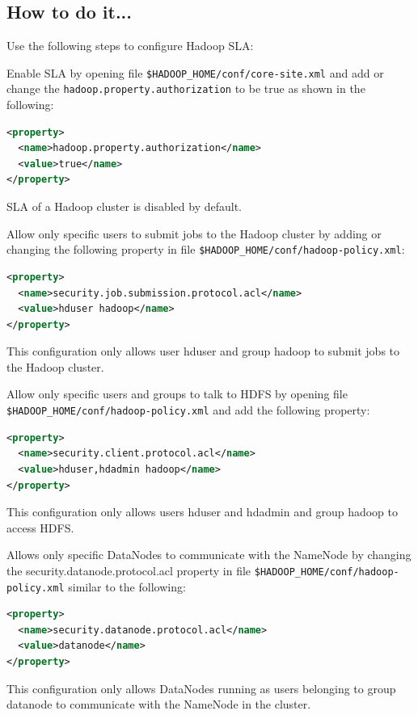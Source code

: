 \subsection*{How to do it...}
Use the following steps to configure Hadoop SLA:

Enable SLA by opening file \verb|$HADOOP_HOME/conf/core-site.xml| and add or change the \verb|hadoop.property.authorization| to be true as shown in the following:
\lstset{style=bashstyle}
\begin{lstlisting}[language=XML]
<property>
  <name>hadoop.property.authorization</name>
  <value>true</name>
</property>
\end{lstlisting}

SLA of a Hadoop cluster is disabled by default.

Allow only specific users to submit jobs to the Hadoop cluster by adding or changing the following property in file \verb|$HADOOP_HOME/conf/hadoop-policy.xml|:
\lstset{style=bashstyle}
\begin{lstlisting}[language=XML]
<property>
  <name>security.job.submission.protocol.acl</name>
  <value>hduser hadoop</name>
</property>
\end{lstlisting}

This configuration only allows user hduser and group hadoop to submit jobs to the Hadoop cluster.

Allow only specific users and groups to talk to HDFS by opening file \verb|$HADOOP_HOME/conf/hadoop-policy.xml| and add the following property:
\lstset{style=bashstyle}
\begin{lstlisting}[language=XML]
<property>
  <name>security.client.protocol.acl</name>
  <value>hduser,hdadmin hadoop</name>
</property>
\end{lstlisting}

This configuration only allows users hduser and hdadmin and group hadoop to access HDFS.

Allows only specific DataNodes to communicate with the NameNode by changing the security.datanode.protocol.acl property in file \verb|$HADOOP_HOME/conf/hadoop-policy.xml| similar to the following:
\lstset{style=bashstyle}
\begin{lstlisting}[language=XML]
<property>
  <name>security.datanode.protocol.acl</name>
  <value>datanode</name>
</property>
\end{lstlisting}

This configuration only allows DataNodes running as users belonging to group datanode to communicate with the NameNode in the cluster.

